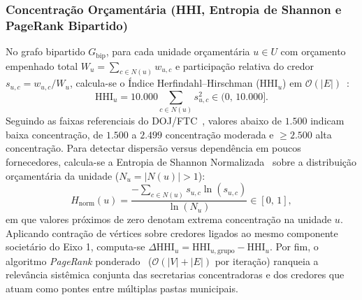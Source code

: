 \subsubsection{Concentração Orçamentária (HHI, Entropia de Shannon e PageRank Bipartido)}
No grafo bipartido $G_{\text{bip}}$, para cada unidade orçamentária $u \in U$ com orçamento empenhado total $W_u = \sum_{c \in N(u)} w_{u,c}$ e participação relativa do credor $s_{u,c} = w_{u,c} / W_u$, calcula-se o Índice Herfindahl--Hirschman ($\text{HHI}_u$) em $\mathcal{O}(|E|)$~\cite{rhoades1993herfindahl}:
\begin{equation}
  \text{HHI}_u = 10.000 \sum_{c \in N(u)} s_{u,c}^2 \in (0,\, 10.000].
\end{equation}
Seguindo as faixas referenciais do DOJ/FTC~\cite{doj2010horizontal}, valores abaixo de $1.500$ indicam baixa concentração, de $1.500$ a $2.499$ concentração moderada e $\ge 2.500$ alta concentração. Para detectar dispersão versus dependência em poucos fornecedores, calcula-se a Entropia de Shannon Normalizada~\cite{shannon1948mathematical} sobre a distribuição orçamentária da unidade ($N_u = |N(u)| > 1$):
\begin{equation}
  H_{\text{norm}}(u) = \frac{-\sum_{c \in N(u)} s_{u,c} \ln(s_{u,c})}{\ln(N_u)} \in [0,\, 1],
\end{equation}
em que valores próximos de zero denotam extrema concentração na unidade $u$. Aplicando contração de vértices sobre credores ligados ao mesmo componente societário do Eixo 1, computa-se $\Delta\text{HHI}_u = \text{HHI}_{u,\text{grupo}} - \text{HHI}_u$. Por fim, o algoritmo \textit{PageRank} ponderado~\cite{brin1998anatomy} ($\mathcal{O}(|V|+|E|)$ por iteração) ranqueia a relevância sistêmica conjunta das secretarias concentradoras e dos credores que atuam como pontes entre múltiplas pastas municipais.
